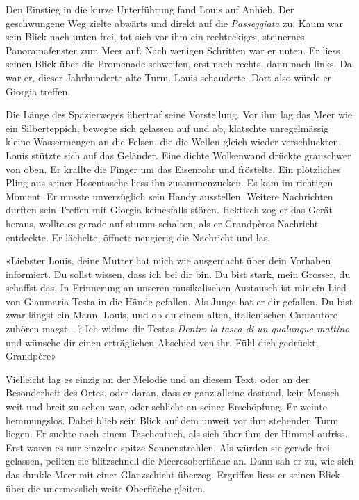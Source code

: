 Den Einstieg in die kurze Unterführung fand Louis auf Anhieb. Der
geschwungene Weg zielte abwärts und direkt auf die \emph{Passeggiata}
zu. Kaum war sein Blick nach unten frei, tat sich vor ihm ein
rechteckiges, steinernes Panoramafenster zum Meer auf. Nach wenigen Schritten war er unten.
Er liess seinen Blick über die Promenade schweifen, erst nach rechts,
dann nach links. Da war er, dieser Jahrhunderte alte Turm. Louis
schauderte. Dort also würde er Giorgia treffen. 

Die Länge des Spazierweges übertraf seine Vorstellung. Vor ihm lag das
Meer wie ein Silberteppich, bewegte sich gelassen auf und ab, klatschte
unregelmässig kleine Wassermengen an die Felsen, die die Wellen gleich
wieder verschluckten.
Louis stützte sich auf das Geländer. Eine dichte Wolkenwand drückte 
grauschwer von oben. Er krallte die Finger um das Eisenrohr und fröstelte. 
Ein plötzliches Pling aus seiner Hosentasche liess ihn zusammenzucken. Es kam im richtigen Moment. Er musste unverzüglich sein Handy ausstellen. 
Weitere Nachrichten durften sein Treffen mit Giorgia keinesfalls stören. Hektisch zog er das Gerät heraus, wollte es gerade auf stumm schalten, 
als er Grandpères Nachricht entdeckte. Er lächelte, öffnete neugierig die Nachricht und las.

«Liebster Louis, deine Mutter hat mich wie ausgemacht über dein Vorhaben informiert. 
Du sollst wissen, dass ich bei dir bin. Du bist stark, mein Grosser, du schaffst das. 
In Erinnerung an unseren musikalischen Austausch ist mir ein Lied von Gianmaria Testa in die Hände gefallen. 
Als Junge hat er dir gefallen. Du bist zwar längst ein Mann, Louis, und ob du einem alten, italienischen Cantautore zuhören magst - ? 
Ich widme dir Testas \emph{Dentro la tasca di un qualunque mattino} und wünsche dir einen erträglichen Abschied von ihr. Fühl dich gedrückt, Grandpère» 


Vielleicht lag es einzig an der Melodie und an diesem Text, oder an der Besonderheit des Ortes, oder daran, dass er ganz alleine dastand, kein Mensch weit und breit zu sehen war, oder schlicht an seiner Erschöpfung. Er weinte hemmungslos. Dabei blieb sein Blick auf dem unweit vor ihm stehenden Turm liegen. Er suchte nach einem Taschentuch, als sich über ihm der Himmel aufriss.
Erst waren es nur einzelne spitze Sonnenstrahlen. Als würden sie gerade
frei gelassen, peilten sie blitzschnell die Meeresoberfläche an. Dann
sah er zu, wie sich das dunkle Meer mit einer Glanzschicht überzog.
Ergriffen liess er seinen Blick über die unermesslich weite Oberfläche
gleiten.


